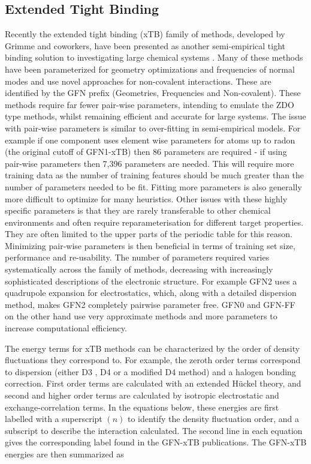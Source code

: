 \subsection{Extended Tight Binding}
\label{subsec:xtb_methods}

Recently the extended tight binding (xTB) family of methods, developed by Grimme 
and coworkers, have been presented as another semi-empirical tight binding solution
to investigating large chemical systems \cite{Bannwarth2020, Bannwarth2019, Grimme2017, Pracht2019, Grimme2016, Spicher2020a}.
Many of these methods have been parameterized for geometry optimizations and frequencies 
of normal modes and use novel approaches for non-covalent interactions. These are
identified by the GFN prefix (Geometries, Frequencies and Non-covalent). These methods
require far fewer pair-wise parameters, intending to emulate the ZDO type methods,
whilst remaining efficient and accurate for large systems. The issue with pair-wise 
parameters is similar to over-fitting in semi-empirical models. For example if one 
component uses element wise parameters for atoms up to radon (the original cutoff 
of GFN1-xTB) then 86 parameters are required - if using pair-wise parameters then 
7,396 parameters are needed. This will require more training data as the number
of training features should be much greater than the number of parameters needed 
to be fit. Fitting more parameters is also generally more difficult to optimize 
for many heuristics. Other issues with these highly specific parameters is that 
they are rarely transferable to other chemical environments and often require 
reparameterisation for different target properties. They are often limited to the
upper parts of the periodic table for this reason. Minimizing pair-wise parameters 
is then beneficial in terms of training set size, performance and re-usability. 
The number of parameters required varies systematically across the family of methods, 
decreasing with increasingly sophisticated descriptions of the electronic structure. 
For example GFN2 uses a quadrupole expansion for electrostatics, which, along with 
a detailed dispersion method, makes GFN2 completely pairwise parameter free. GFN0 
and GFN-FF on the other hand use very approximate methods and more parameters to 
increase computational efficiency. 

The energy terms for xTB methods can be characterized by the order of density fluctuations 
they correspond to. For example, the zeroth order terms correspond to dispersion 
(either D3 \cite{Grimme2010}, D4 \cite{Caldeweyher2020} or a modified D4 method) and
a halogen bonding correction. First order terms are calculated with an extended 
H\"{u}ckel theory, and second and higher order terms are calculated by isotropic
electrostatic and exchange-correlation terms. In the equations below, these energies
are first labelled with a superscript $\left(n\right)$ to identify the density fluctuation 
order, and a subscript to describe the interaction calculated. The second line in
each equation gives the corresponding label found in the GFN-xTB publications. The
GFN-xTB energies are then summarized as

